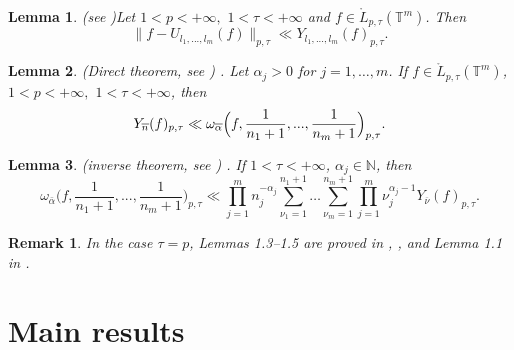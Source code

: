 \documentclass[12pt]{article}
\theoremstyle{plain}
\newtheorem{rem}{Remark}[section]
\newtheorem{lemma}{Lemma}[section]
\begin{document}
\begin{lemma}(see \cite[Lemma 3]{3} )\label{lem1 5}
Let 
 $1 < p < +\infty,$\,\,$1 < \tau < +\infty$ and $f\in {\mathring L}_{p, \tau}(\mathbb{T}^{m})$. Then 
 \begin{equation*}
\|f - U_{l_{1},...,l_{m}} (f)\|_{p, \tau}\ll Y_{l_{1},...,l_{m}}(f)_{p, \tau}.
\end{equation*}
\end{lemma}
\begin{lemma}(Direct theorem, see \cite[lemma 4]{3})
\label{lem1 6}. Let $\alpha_{j}> 0$ for $j=1,\ldots,m$. If
 $f\in \mathring{L}_{p, \tau}(\mathbb{T}^{m})$,  $1<p<+\infty,$
$1<\tau <+\infty$, then 
 \begin{equation*}
Y_{\overline{n}}(f)_{p, \tau}\ll \omega_{\overline{\alpha}}
\Bigl(f,\frac{1}{n_{1}+1},...,\frac{1}{n_{m}+1}\Bigr)_{p, \tau}.
 \end{equation*}
\end{lemma}

\begin{lemma} (inverse theorem, see \cite{3}) 
\label{lem1 7}. 
If $1<\tau <+\infty$, $\alpha_{j}\in \mathbb{N}$, then 
 \begin{equation*}
 \omega_{\bar\alpha}\bigl(f,\frac{1}{n_{1}+1},...,\frac{1}{n_{m}+1}\bigr)_{p, \tau}
\ll\prod_{j=1}^{m}n_{j}^{-\alpha_{j}}\sum\limits_{\nu_{1}=1}^{n_{1}+1} \ldots \sum\limits_{\nu_{m}=1}^{n_{m}+1} \prod_{j=1}^{m}\nu_{j}^{\alpha_{j} - 1}Y_{\overline{\nu}}(f)_{p, \tau}.
 \end{equation*}
\end{lemma}

\begin{rem}\label{rem1.3} In the case $\tau = p$, Lemmas 1.3--1.5 are proved in \cite{14}, \cite{17}, and Lemma 1.1 in \cite{10}.
\end{rem}

  \smallskip


\setcounter{equation}{0}
\setcounter{lemma}{0}
\setcounter{theorem}{0}

\section{Main results}\label{sec2} 
\end{document}
